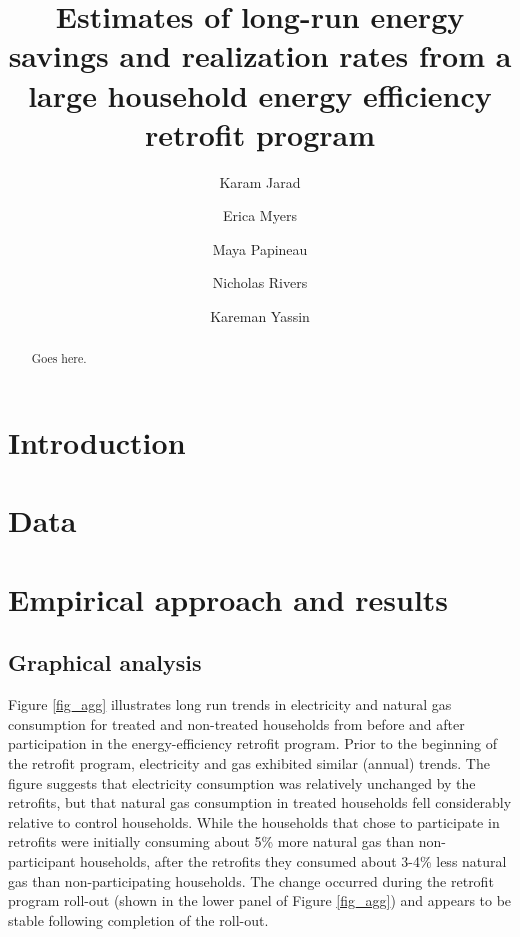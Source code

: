 \documentclass{article}
\author{
    Karam Jarad
    \and
    Erica Myers
    \and
    Maya Papineau
    \and
    Nicholas Rivers
    \and 
    Kareman Yassin
}
\title{
    Estimates of long-run energy savings and realization rates from a large household energy efficiency retrofit program
}
\begin{document}
\maketitle

\begin{abstract}
	Goes here.
\end{abstract}

\section{Introduction}

\section{Data}

\section{Empirical approach and results}

\subsection{Graphical analysis}
Figure \ref{fig_agg} illustrates long run trends in electricity and natural gas consumption for treated and non-treated households from before and after participation in the energy-efficiency retrofit program. Prior to the beginning of the retrofit program, electricity and gas exhibited similar (annual) trends. The figure suggests that electricity consumption was relatively unchanged by the retrofits, but that natural gas consumption in treated households fell considerably relative to control households. While the households that chose to participate in retrofits were initially consuming about 5\% more natural gas than non-participant households, after the retrofits they consumed about 3-4\% less natural gas than non-participating households. The change occurred during the retrofit program roll-out (shown in the lower panel of Figure \ref{fig_agg}) and appears to be stable following completion of the roll-out.
\end{document}

